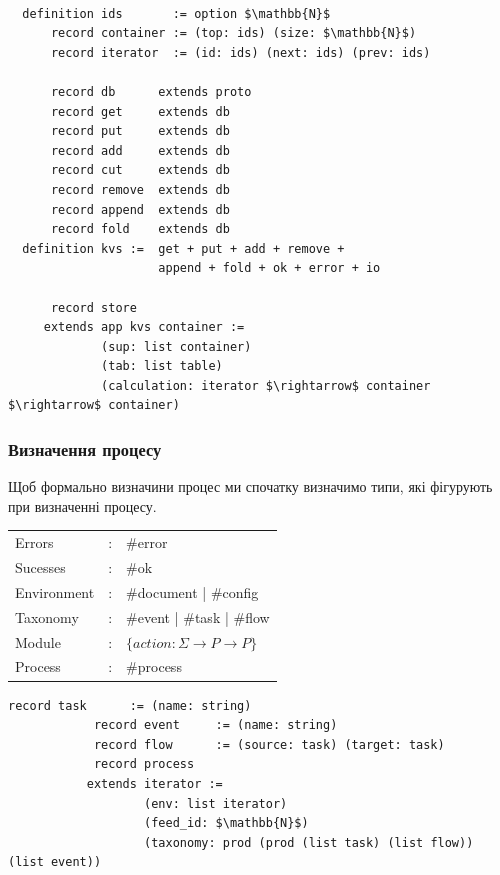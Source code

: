 \documentclass[11pt,oneside]{article}
\begin{document}
\begin{center}
\begin{lstlisting}[mathescape=true]

  definition ids       := option $\mathbb{N}$
      record container := (top: ids) (size: $\mathbb{N}$)
      record iterator  := (id: ids) (next: ids) (prev: ids)

      record db      extends proto
      record get     extends db
      record put     extends db
      record add     extends db
      record cut     extends db
      record remove  extends db
      record append  extends db
      record fold    extends db
  definition kvs :=  get + put + add + remove +
                     append + fold + ok + error + io

      record store
     extends app kvs container :=
             (sup: list container)
             (tab: list table)
             (calculation: iterator $\rightarrow$ container $\rightarrow$ container)

\end{lstlisting}
\end{center}

\newpage
   \subsubsection{Визначення процесу}

   Щоб формально визначини процес ми спочатку визначимо типи,
   які фігурують при визначенні процесу.

\begin{center}
\begin{tabular}{lcl}
                Errors &:& \#error\\
              Sucesses &:& \#ok \\
           Environment &:& \#document | \#config\\
              Taxonomy &:& \#event    | \#task   | \#flow\\
                Module &:& $\{ action : \Sigma \rightarrow P \rightarrow P \}$ \\ \hline
               Process &:& \#process\\
\end{tabular}
\end{center}

\begin{center}
\begin{lstlisting}[mathescape=true]
            record task      := (name: string)
            record event     := (name: string)
            record flow      := (source: task) (target: task)
            record process
           extends iterator :=
                   (env: list iterator)
                   (feed_id: $\mathbb{N}$)
                   (taxonomy: prod (prod (list task) (list flow)) (list event))
\end{lstlisting}
\end{center}
\end{document}
